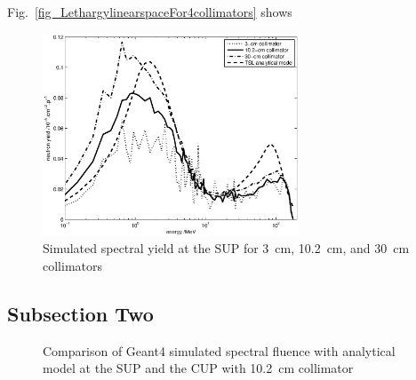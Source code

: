 \documentclass[12pt,journal]{IEEEtran}
\let\MYoriglatexcaption\caption
\renewcommand{\caption}[2][\relax]{\MYoriglatexcaption[#2]{#2}}
\begin{document}
Fig.~\ref{fig_LethargylinearspaceFor4collimators} shows

\begin{figure}[!t]
	\centering
	\includegraphics[width=3in]{SUPcomparedlinearspace.eps}
	\caption{Simulated spectral yield at the SUP for \SI{3}{\cm}, \SI{10.2}{\cm}, and \SI{30}{\cm} collimators}
	\label{fig:SUPcomparedlinearspace}
\end{figure}

\subsection{Subsection Two}
\begin{figure}[!t]
	\centering
	\hfil
	\caption{Comparison of Geant4 simulated spectral fluence with analytical model at the SUP and the CUP with \SI{10.2}{\cm} collimator~\cite{Prokofiev2009,Prokofiev14}}
	\label{fig:NYieldComparedSUPCUP10}
\end{figure}
\end{document}
